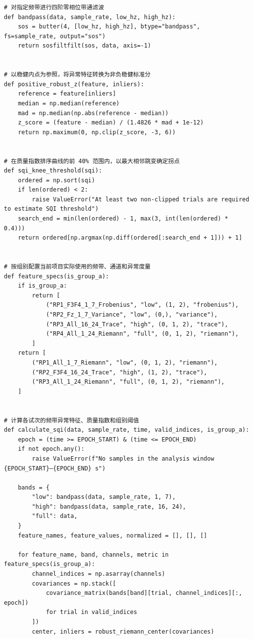 \begin{appendices}
\begin{lstlisting}[style=appendixPython]
# 对指定频带进行四阶零相位带通滤波
def bandpass(data, sample_rate, low_hz, high_hz):
    sos = butter(4, [low_hz, high_hz], btype="bandpass", fs=sample_rate, output="sos")
    return sosfiltfilt(sos, data, axis=-1)


# 以稳健内点为参照，将异常特征转换为非负稳健标准分
def positive_robust_z(feature, inliers):
    reference = feature[inliers]
    median = np.median(reference)
    mad = np.median(np.abs(reference - median))
    z_score = (feature - median) / (1.4826 * mad + 1e-12)
    return np.maximum(0, np.clip(z_score, -3, 6))


# 在质量指数排序曲线的前 40% 范围内，以最大相邻跳变确定拐点
def sqi_knee_threshold(sqi):
    ordered = np.sort(sqi)
    if len(ordered) < 2:
        raise ValueError("At least two non-clipped trials are required to estimate SQI threshold")
    search_end = min(len(ordered) - 1, max(3, int(len(ordered) * 0.4)))
    return ordered[np.argmax(np.diff(ordered[:search_end + 1])) + 1]


# 按组别配置当前项目实际使用的频带、通道和异常度量
def feature_specs(is_group_a):
    if is_group_a:
        return [
            ("RP1_F3F4_1_7_Frobenius", "low", (1, 2), "frobenius"),
            ("RP2_Fz_1_7_Variance", "low", (0,), "variance"),
            ("RP3_All_16_24_Trace", "high", (0, 1, 2), "trace"),
            ("RP4_All_1_24_Riemann", "full", (0, 1, 2), "riemann"),
        ]
    return [
        ("RP1_All_1_7_Riemann", "low", (0, 1, 2), "riemann"),
        ("RP2_F3F4_16_24_Trace", "high", (1, 2), "trace"),
        ("RP3_All_1_24_Riemann", "full", (0, 1, 2), "riemann"),
    ]


# 计算各试次的频带异常特征、质量指数和组别阈值
def calculate_sqi(data, sample_rate, time, valid_indices, is_group_a):
    epoch = (time >= EPOCH_START) & (time <= EPOCH_END)
    if not epoch.any():
        raise ValueError(f"No samples in the analysis window {EPOCH_START}–{EPOCH_END} s")

    bands = {
        "low": bandpass(data, sample_rate, 1, 7),
        "high": bandpass(data, sample_rate, 16, 24),
        "full": data,
    }
    feature_names, feature_values, normalized = [], [], []

    for feature_name, band, channels, metric in feature_specs(is_group_a):
        channel_indices = np.asarray(channels)
        covariances = np.stack([
            covariance_matrix(bands[band][trial, channel_indices][:, epoch])
            for trial in valid_indices
        ])
        center, inliers = robust_riemann_center(covariances)


\end{lstlisting}
\end{appendices}
